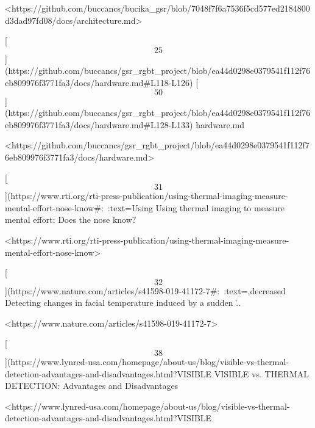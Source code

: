 \documentclass[12pt,a4paper]{article}
\begin{document}
<https://github.com/buccancs/bucika_gsr/blob/7048f7f6a7536f5cd577ed2184800d3dad97fd08/docs/architecture.md>

[\[25\]](https://github.com/buccancs/gsr_rgbt_project/blob/ea44d0298e0379541f112f76eb809976f3771fa3/docs/hardware.md#L118-L126)
[\[50\]](https://github.com/buccancs/gsr_rgbt_project/blob/ea44d0298e0379541f112f76eb809976f3771fa3/docs/hardware.md#L128-L133)
hardware.md

<https://github.com/buccancs/gsr_rgbt_project/blob/ea44d0298e0379541f112f76eb809976f3771fa3/docs/hardware.md>

[\[31\]](https://www.rti.org/rti-press-publication/using-thermal-imaging-measure-mental-effort-nose-know#:~:text=Using%
Using thermal imaging to measure mental effort: Does the nose know?

<https://www.rti.org/rti-press-publication/using-thermal-imaging-measure-mental-effort-nose-know>

[\[32\]](https://www.nature.com/articles/s41598-019-41172-7#:~:text=,decreased%
Detecting changes in facial temperature induced by a sudden \...

<https://www.nature.com/articles/s41598-019-41172-7>

[\[38\]](https://www.lynred-usa.com/homepage/about-us/blog/visible-vs-thermal-detection-advantages-and-disadvantages.html?VISIBLE%
VISIBLE vs. THERMAL DETECTION: Advantages and Disadvantages

<https://www.lynred-usa.com/homepage/about-us/blog/visible-vs-thermal-detection-advantages-and-disadvantages.html?VISIBLE%
\end{document}
